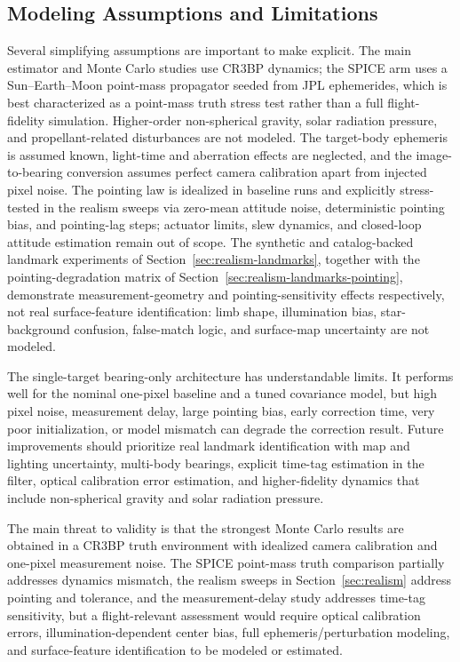 \documentclass[10pt,twocolumn]{article}
\begin{document}
\subsection{Modeling Assumptions and Limitations}
\label{sec:limitations}
Several simplifying assumptions are important to make explicit.  The main estimator and Monte Carlo studies use CR3BP dynamics; the SPICE arm uses a Sun--Earth--Moon point-mass propagator seeded from JPL ephemerides, which is best characterized as a point-mass truth stress test rather than a full flight-fidelity simulation.  Higher-order non-spherical gravity, solar radiation pressure, and propellant-related disturbances are not modeled.  The target-body ephemeris is assumed known, light-time and aberration effects are neglected, and the image-to-bearing conversion assumes perfect camera calibration apart from injected pixel noise.  The pointing law is idealized in baseline runs and explicitly stress-tested in the realism sweeps via zero-mean attitude noise, deterministic pointing bias, and pointing-lag steps; actuator limits, slew dynamics, and closed-loop attitude estimation remain out of scope.  The synthetic and catalog-backed landmark experiments of Section~\ref{sec:realism-landmarks}, together with the pointing-degradation matrix of Section~\ref{sec:realism-landmarks-pointing}, demonstrate measurement-geometry and pointing-sensitivity effects respectively, not real surface-feature identification: limb shape, illumination bias, star-background confusion, false-match logic, and surface-map uncertainty are not modeled.

The single-target bearing-only architecture has understandable limits.  It performs well for the nominal one-pixel baseline and a tuned covariance model, but high pixel noise, measurement delay, large pointing bias, early correction time, very poor initialization, or model mismatch can degrade the correction result.  Future improvements should prioritize real landmark identification with map and lighting uncertainty, multi-body bearings, explicit time-tag estimation in the filter, optical calibration error estimation, and higher-fidelity dynamics that include non-spherical gravity and solar radiation pressure.

The main threat to validity is that the strongest Monte Carlo results are obtained in a CR3BP truth environment with idealized camera calibration and one-pixel measurement noise.  The SPICE point-mass truth comparison partially addresses dynamics mismatch, the realism sweeps in Section~\ref{sec:realism} address pointing and tolerance, and the measurement-delay study addresses time-tag sensitivity, but a flight-relevant assessment would require optical calibration errors, illumination-dependent center bias, full ephemeris/perturbation modeling, and surface-feature identification to be modeled or estimated.
\end{document}
